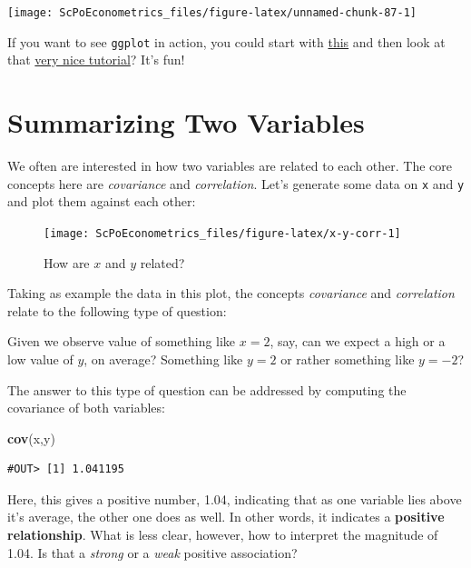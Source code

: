 \documentclass[]{book}
\newenvironment{Shaded}{\begin{snugshade}}{\end{snugshade}}
\newcommand{\KeywordTok}[1]{\textcolor[rgb]{0.13,0.29,0.53}{\textbf{#1}}}
\newcommand{\NormalTok}[1]{#1}
\newenvironment{note}{\begin{tcolorbox}[colback=blue!5!white,colframe=blue!75!black]}{\end{tcolorbox}}
\begin{document}
\begin{center}\texttt{[image: ScPoEconometrics\_files/figure-latex/unnamed-chunk-87-1]} \end{center}

If you want to see \texttt{ggplot} in action, you could start with
\href{http://jcyhong.github.io/ggplot_demo.html}{this} and then look at
that
\href{https://tutorials.iq.harvard.edu/R/Rgraphics/Rgraphics.html}{very
nice tutorial}? It's fun!

\section{Summarizing Two Variables}\label{summarize-two}

We often are interested in how two variables are related to each other.
The core concepts here are \emph{covariance} and \emph{correlation}.
Let's generate some data on \texttt{x} and \texttt{y} and plot them
against each other:

\begin{figure}

{\centering \texttt{[image: ScPoEconometrics\_files/figure-latex/x-y-corr-1]} 

}

\caption{How are $x$ and $y$ related?}\label{fig:x-y-corr}
\end{figure}

Taking as example the data in this plot, the concepts \emph{covariance}
and \emph{correlation} relate to the following type of question:

\begin{note}
Given we observe value of something like \(x=2\), say, can we expect a
high or a low value of \(y\), on average? Something like \(y=2\) or
rather something like \(y=-2\)?
\end{note}

 The answer to this type of question can be addressed by computing the
covariance of both variables:

\begin{Shaded}
\begin{Highlighting}[]
\KeywordTok{cov}\NormalTok{(x,y)  }
\end{Highlighting}
\end{Shaded}

\begin{verbatim}
#OUT> [1] 1.041195
\end{verbatim}

Here, this gives a positive number, 1.04, indicating that as one
variable lies above it's average, the other one does as well. In other
words, it indicates a \textbf{positive relationship}. What is less
clear, however, how to interpret the magnitude of 1.04. Is that a
\emph{strong} or a \emph{weak} positive association?
\end{document}
